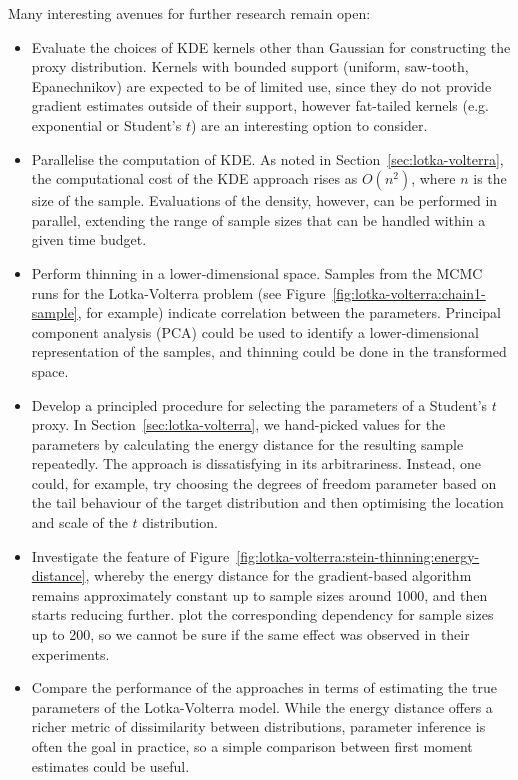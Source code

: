 \documentclass[11pt,a4paper]{report}
\begin{document}
Many interesting avenues for further research remain open:
\begin{itemize}

\item Evaluate the choices of KDE kernels other than Gaussian for constructing the proxy distribution. Kernels with bounded support (uniform, saw-tooth, Epanechnikov) are expected to be of limited use, since they do not provide gradient estimates outside of their support, however fat-tailed kernels (e.g. exponential or Student's $t$) are an interesting option to consider.

\item Parallelise the computation of KDE. As noted in Section~\ref{sec:lotka-volterra}, the computational cost of the KDE approach rises as $O(n^2)$, where $n$ is the size of the sample. Evaluations of the density, however, can be performed in parallel, extending the range of sample sizes that can be handled within a given time budget.

\item Perform thinning in a lower-dimensional space. Samples from the MCMC runs for the Lotka-Volterra problem (see Figure~\ref{fig:lotka-volterra:chain1-sample}, for example) indicate correlation between the parameters. Principal component analysis (PCA) could be used to identify a lower-dimensional representation of the samples, and thinning could be done in the transformed space.

\item Develop a principled procedure for selecting the parameters of a Student's $t$ proxy. In Section~\ref{sec:lotka-volterra}, we hand-picked values for the parameters by calculating the energy distance for the resulting sample repeatedly. The approach is dissatisfying in its arbitrariness. Instead, one could, for example, try choosing the degrees of freedom parameter based on the tail behaviour of the target distribution and then optimising the location and scale of the $t$ distribution.

\item Investigate the feature of Figure~\ref{fig:lotka-volterra:stein-thinning:energy-distance}, whereby the energy distance for the gradient-based algorithm remains approximately constant up to sample sizes around 1000, and then starts reducing further. \cite{riabizOptimalThinningMCMC2022} plot the corresponding dependency for sample sizes up to 200, so we cannot be sure if the same effect was observed in their experiments.

\item Compare the performance of the approaches in terms of estimating the true parameters of the Lotka-Volterra model. While the energy distance offers a richer metric of dissimilarity between distributions, parameter inference is often the goal in practice, so a simple comparison between first moment estimates could be useful.


\end{itemize}
\end{document}
